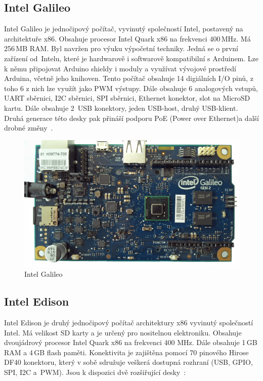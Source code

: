 		\subsection{Intel Galileo}
		Intel Galileo je jednočipový počítač, vyvinutý společností Intel, postavený na architektuře x86. Obsahuje procesor Intel Quark x86 na frekvenci 400\,MHz. Má 256\,MB RAM. Byl navržen pro výuku výpočetní techniky. Jedná se o první zařízení od~Intelu, které je hardwarově i softwarově kompatibilní s Arduinem. Lze k němu připojovat Arduino shieldy i moduly a využívat vývojové prostředí Arduina, včetně jeho knihoven. 
		Tento počítač obsahuje 14 digiálních I/O pinů, z toho 6 z nich lze využít jako PWM výstupy. Dále obsahuje 6 analogových vstupů, UART sběrnici, I2C sběrnici, SPI sběrnici, Ethernet konektor, slot na MicroSD kartu. Dále obsahuje 2~USB konektory, jeden USB-host, druhý USB-klient. Druhá generace této desky pak přináší podporu PoE (Power over Ethernet)a další drobné změny~\cite{IntelGalileo,ArduinoGalileo}.
\begin{figure}[!ht]
  \begin{center}
    \includegraphics[scale=0.45]{obrazky/embed_intel_galileo}
  \end{center}
	\vspace{-20pt}
  \caption{Intel Galileo~\cite{IntelGalileo}}
	\vspace{-10pt}
\end{figure}
		
		
		\subsection{Intel Edison} 
		Intel Edison je druhý jednočipový počítač architektury x86 vyvinutý společností Intel. Má velikost SD karty a je určený pro nositelnou elektroniku. Obsahuje dvoujádrový procesor Intel Quark x86 na frekvenci 400 MHz. Dále obsahuje 1\,GB RAM a 4\,GB flash paměti. Konektivita je zajištěna pomocí 70 pinového Hirose DF40 konektoru, který v sobě sdružuje veškerá dostupná rozhraní (USB, GPIO, SPI, I2C a~PWM). Jsou k dispozici dvě rozšiřující desky~\cite{IntelEdison}:
			
